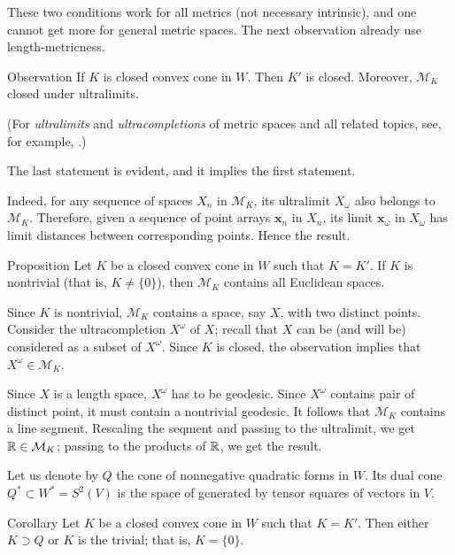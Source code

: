 \documentclass[a4paper,10pt]{article}
\begin{document}
These two conditions work for all metrics (not necessary intrinsic),
and one cannot get more for general metric spaces.
The next observation already use length-metricness.

\begin{thm}{Observation}
If $K$ is closed convex cone in $W$.
Then $K'$ is closed.
Moreover, $\mathcal{M}_K$ closed under ultralimits.
\end{thm}


(For \emph{ultralimits} and \emph{ultracompletions} of metric spaces and all related topics, see, for example, \cite{petrunin2023}.)

The last statement is evident, and it implies the first statement.

Indeed, for any sequence of spaces $X_n$ in $\mathcal{M}_K$, its ultralimit $X_\omega$ also belongs to $\mathcal{M}_K$.
Therefore, given a sequence of point arrays $\bm{x}_n$ in $X_n$,
its limit $\bm{x}_\omega$ in $X_\omega$ has limit distances between corresponding points.
Hence the result.
\qeds

\begin{thm}{Proposition}
Let $K$ be a closed convex cone in $W$ such that $K=K'$.
If $K$ is nontrivial (that is, $K\ne \{0\}$), then $\mathcal{M}_K$ contains all Euclidean spaces.
\end{thm}

Since $K$ is nontrivial, $\mathcal{M}_K$ contains a space, say $X$, with two distinct points.
Consider the ultracompletion $X^\omega$ of $X$;
recall that $X$ can be (and will be) considered as a subset of $X^\omega$.
Since $K$ is closed, the observation implies that $X^\omega\in \mathcal{M}_K$.

Since  $X$ is a length space, $X^\omega$ has to be geodesic.
Since $X^\omega$ contains pair of distinct point, it must contain a nontrivial geodesic.
It follows that $\mathcal{M}_K$ contains a line segment.
Rescaling the seqment and passing to the ultralimit, we get $\mathbb{R}\in \mathcal{M}_K$;
passing to the products of $\mathbb{R}$, we get the result. 
\qeds

Let us denote by $Q$ the cone of nonnegative quadratic forms in $W$.
Its dual cone $Q^*\subset W^*=S^2(V)$ is the space of generated by tensor squares of vectors in $V$. 

\begin{thm}{Corollary}
Let $K$ be a closed convex cone in $W$ such that $K=K'$.
Then either $K\supset Q$ or $K$ is the trivial; that is, $K=\{0\}$.
\end{thm}
\end{document}

